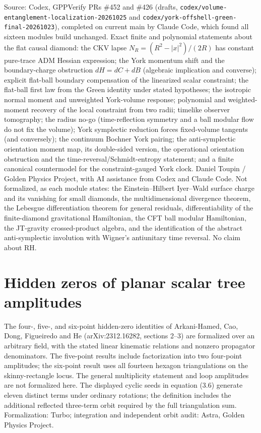 \documentclass{report}
\theoremstyle{definition}
\begin{document}
\begin{itemize}
\begin{itemize}
Source: Codex, GPPVerify PRs \#452 and \#426 (drafts, \texttt{codex/volume-entanglement-localization-20261025} and \texttt{codex/york-offshell-green-final-20261023}), completed on current main by Claude Code, which found all sixteen modules build unchanged. Exact finite and polynomial statements about the flat causal diamond: the CKV lapse $N_R=(R^2-|x|^2)/(2R)$ has constant pure-trace ADM Hessian expression; the York momentum shift and the boundary-charge obstruction $dH=dC+dB$ (algebraic implication and converse); explicit flat-ball boundary compensation of the linearized scalar constraint; the flat-ball first law from the Green identity under stated hypotheses; the isotropic normal moment and unweighted York-volume response; polynomial and weighted-moment recovery of the local constraint from two radii; timelike observer tomography; the radius no-go (time-reflection symmetry and a ball modular flow do not fix the volume); York symplectic reduction forces fixed-volume tangents (and conversely); the continuum Bochner York pairing; the anti-symplectic orientation moment map, its double-sided version, the operational orientation obstruction and the time-reversal/Schmidt-entropy statement; and a finite canonical countermodel for the constraint-gauged York clock.
Daniel Toupin / Golden Physics Project, with AI assistance from Codex and Claude Code. Not formalized, as each module states: the Einstein--Hilbert Iyer--Wald surface charge and its vanishing for small diamonds, the multidimensional divergence theorem, the Lebesgue differentiation theorem for general residuals, differentiability of the finite-diamond gravitational Hamiltonian, the CFT ball modular Hamiltonian, the JT-gravity crossed-product algebra, and the identification of the abstract anti-symplectic involution with Wigner's antiunitary time reversal. No claim about RH.

\section{Hidden zeros of planar scalar tree amplitudes}
\label{sec:hidden-zeros}
\leanok
The four-, five-, and six-point hidden-zero identities of Arkani-Hamed, Cao,
Dong, Figueiredo and He (arXiv:2312.16282, sections 2--3) are formalized over
an arbitrary field, with the stated linear kinematic relations and nonzero
propagator denominators. The five-point results include factorization into
two four-point amplitudes; the six-point result uses all fourteen hexagon
triangulations on the skinny-rectangle locus. The general multiplicity
statement and loop amplitudes are not formalized here. The displayed cyclic
seeds in equation (3.6) generate eleven distinct terms under ordinary
rotations; the definition includes the additional reflected three-term
orbit required by the full triangulation sum. Formalization: Turbo;
integration and independent orbit audit: Astra, Golden Physics Project.


\end{itemize}
\end{itemize}
\end{document}
